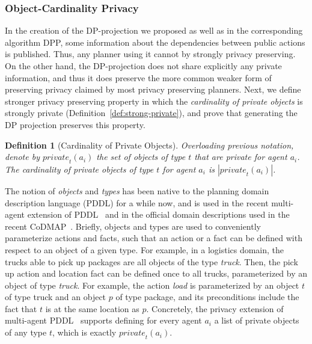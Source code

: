 \documentclass[letterpaper]{article}
\newcommand{\private}[2]{\textit{private}_{#1}(#2)}
\newtheorem{definition}{Definition}
\theoremstyle{definition}
\begin{document}
\subsubsection{Object-Cardinality Privacy}
In the creation of the DP-projection we proposed as well as in the corresponding algorithm DPP, some information about the dependencies between public actions is published. Thus, any planner using it cannot by strongly privacy preserving. On the other hand, the DP-projection does not share explicitly any private information, and thus it does preserve the more common weaker form of preserving privacy claimed by most privacy preserving planners. 
Next, we define stronger privacy preserving property in which the {\em cardinality of private objects} is strongly private (Definition~\ref{def:strong-private}), and prove that generating the DP projection preserves this property. 

\begin{definition}[Cardinality of Private Objects]
Overloading previous notation, denote by $\private{t}{a_i}$ the set of objects of type $t$ that are private for agent $a_i$. The cardinality of private objects of type $t$ for agent $a_i$ is $|\private{t}{a_i}|$.
\end{definition}

The notion of {\em objects} and {\em types} has been native to the planning domain description language (PDDL) for a while now, and is used in the recent multi-agent extension of PDDL~\cite{kovacs2012multi} and in the official domain descriptions used in the recent CoDMAP~\cite{vstolba2015competition}. Briefly, objects and types are used to conveniently parameterize actions and facts, such that an action or a fact can be defined with respect to an object of a given type. For example, in a logistics domain, the trucks able to pick up packages are all objects of the type {\em truck}. Then, the pick up action and location fact can be defined once to all trucks, parameterized by an object of type {\em truck}. For example, the action {\em load} is parameterized by an object $t$ of type truck and an object $p$ of type package, and its preconditions include the fact that $t$ is at the same location as $p$. %
Concretely, the privacy extension of multi-agent PDDL~\cite{vstolba2015competition} supports defining for every agent $a_i$ a list of private objects of any type $t$, which is exactly $\private{t}{a_i}$. 
\end{document}
